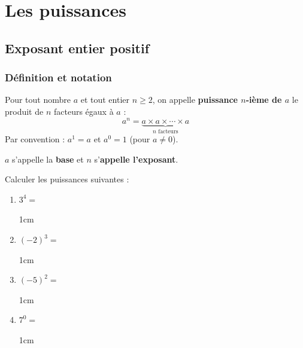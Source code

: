 \documentclass[a4paper]{book}
\begin{document}
\setcounter{chapter}{1}
\renewcommand{\monTitre}{Les puissances}
\chapter{\monTitre}
\thispagestyle{fancy}


\section{Exposant entier positif}

\subsection{Définition et notation}

    \begin{definition}
        Pour tout nombre $a$ et tout entier $n \geq 2$, on appelle \textbf{puissance $n$-ième de $a$} le produit de $n$ facteurs égaux à $a$ :
        \[
            a^n = \underbrace{a \times a \times \cdots \times a}_{n \text{ facteurs}}
        \]
        Par convention : $a^1 = a$ \quad et \quad $a^0 = 1$ \quad (pour $a \neq 0$).
        
        \medskip
        $a$ s'appelle la \textbf{base} et $n$ s'\textbf{appelle l'exposant}.
    \end{definition}

    \begin{exemple}
        Calculer les puissances suivantes :
        \begin{enumerate}
            \item $3^4 = $
            \begin{ZoneReponse}{1cm}
            \end{ZoneReponse}

            \item $(-2)^3 = $
            \begin{ZoneReponse}{1cm}
            \end{ZoneReponse}

            \item $(-5)^2 = $
            \begin{ZoneReponse}{1cm}
            \end{ZoneReponse}

            \item $7^0 = $
            \begin{ZoneReponse}{1cm}
            \end{ZoneReponse}
        \end{enumerate}
    \end{exemple}
\end{document}
